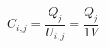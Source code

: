 \documentclass[12pt]{article}
\begin{document}
\begin{displaymath}
C_{i,j} = \frac {Q_{j}} {U_{i,j}} = \frac {Q_{j}} {1 V}
\end{displaymath}
\end{document}
